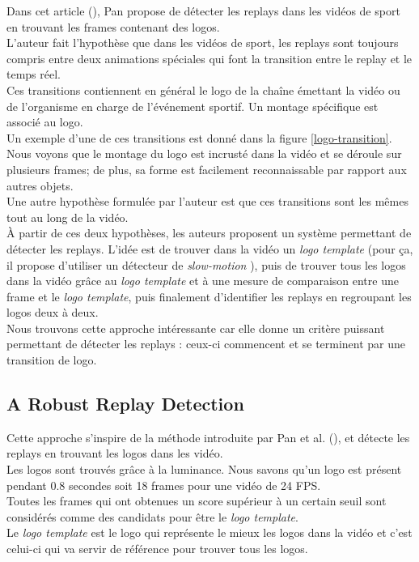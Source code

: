 \documentclass[11pt]{article}
\begin{document}
Dans cet article (\cite{Hao_Pan_2002}), Pan propose de détecter les replays dans les vidéos de sport en trouvant les frames contenant des logos.\\
L'auteur fait l'hypothèse que dans les vidéos de sport, les replays sont toujours compris entre deux animations spéciales qui font la transition entre le replay et le temps réel.\\
Ces transitions contiennent en général le logo de la chaîne émettant la vidéo ou de l'organisme en charge de l'événement sportif. Un montage spécifique est associé au logo.\\
Un exemple d'une de ces transitions est donné dans la figure \ref{logo-transition}. Nous voyons que le montage du logo est incrusté dans la vidéo et se déroule sur plusieurs frames; de plus, sa forme est facilement reconnaissable par rapport aux autres objets.\\
Une autre hypothèse formulée par l'auteur est que ces transitions sont les mêmes tout au long de la vidéo.\\
À partir de ces deux hypothèses, les auteurs proposent un système permettant de détecter les replays. L'idée est de trouver dans la vidéo un \emph{logo template} (pour ça, il propose d'utiliser un détecteur de \emph{slow-motion} \cite{panil_detec}), puis de trouver tous les logos dans la vidéo grâce au \emph{logo template} et à une mesure de comparaison entre une frame et le \emph{logo template}, puis finalement d'identifier les replays en regroupant les logos deux à deux.\\

Nous trouvons cette approche intéressante car elle donne un critère puissant permettant de détecter les replays : ceux-ci commencent et se terminent par une transition de logo.\\
\subsection{A Robust Replay Detection}
\label{sec:orgfb1fe4e}
Cette approche \cite{xu11_robus_replay_detec_algor_soccer_video} s'inspire de la méthode introduite par Pan et al. (\cite{Hao_Pan_2002}), et détecte les replays en trouvant les logos dans les vidéo.\\
Les logos sont trouvés grâce à la luminance. Nous savons qu'un logo est présent pendant 0.8 secondes soit 18 frames pour une vidéo de 24 FPS.\\
Toutes les frames qui ont obtenues un score supérieur à un certain seuil sont considérés comme des candidats pour être le \emph{logo template}.\\
Le \emph{logo template} est le logo qui représente le mieux les logos dans la vidéo et c'est celui-ci qui va servir de référence pour trouver tous les logos.\\
\end{document}
